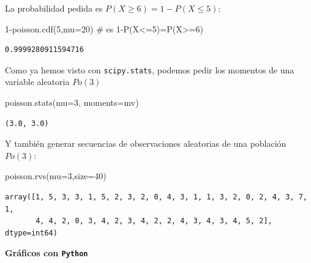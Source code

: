 \documentclass[
  letterpaper,
  DIV=11,
  numbers=noendperiod]{scrreprt}
\newenvironment{Shaded}{\begin{snugshade}}{\end{snugshade}}
\newcommand{\CommentTok}[1]{\textcolor[rgb]{0.37,0.37,0.37}{#1}}
\newcommand{\DecValTok}[1]{\textcolor[rgb]{0.68,0.00,0.00}{#1}}
\newcommand{\NormalTok}[1]{\textcolor[rgb]{0.00,0.23,0.31}{#1}}
\newcommand{\OperatorTok}[1]{\textcolor[rgb]{0.37,0.37,0.37}{#1}}
\newcommand{\StringTok}[1]{\textcolor[rgb]{0.13,0.47,0.30}{#1}}
\begin{document}
La probabilidad pedida es \(P(X\geq 6)=1-P(X\leq 5)\):

\begin{Shaded}
\begin{Highlighting}[]
\DecValTok{1}\OperatorTok{{-}}\NormalTok{poisson.cdf(}\DecValTok{5}\NormalTok{,mu}\OperatorTok{=}\DecValTok{20}\NormalTok{)  }\CommentTok{\# es 1{-}P(X\textless{}=5)=P(X\textgreater{}=6)}
\end{Highlighting}
\end{Shaded}

\begin{verbatim}
0.9999280911594716
\end{verbatim}

Como ya hemos visto con \texttt{scipy.stats}, podemos pedir los momentos
de una variable aleatoria \(Po(3)\)

\begin{Shaded}
\begin{Highlighting}[]
\NormalTok{poisson.stats(mu}\OperatorTok{=}\DecValTok{3}\NormalTok{, moments}\OperatorTok{=}\StringTok{\textquotesingle{}mv\textquotesingle{}}\NormalTok{)}
\end{Highlighting}
\end{Shaded}

\begin{verbatim}
(3.0, 3.0)
\end{verbatim}

Y también generar secuencias de observaciones aleatorias de una
población \(Po(3)\):

\begin{Shaded}
\begin{Highlighting}[]
\NormalTok{poisson.rvs(mu}\OperatorTok{=}\DecValTok{3}\NormalTok{,size}\OperatorTok{=}\DecValTok{40}\NormalTok{)}
\end{Highlighting}
\end{Shaded}

\begin{verbatim}
array([1, 5, 3, 3, 1, 5, 2, 3, 2, 0, 4, 3, 1, 1, 3, 2, 0, 2, 4, 3, 7, 1,
       4, 4, 2, 0, 3, 4, 2, 3, 4, 2, 2, 4, 3, 4, 3, 4, 5, 2], dtype=int64)
\end{verbatim}

\textbf{Gráficos con \texttt{Python}}
\end{document}
